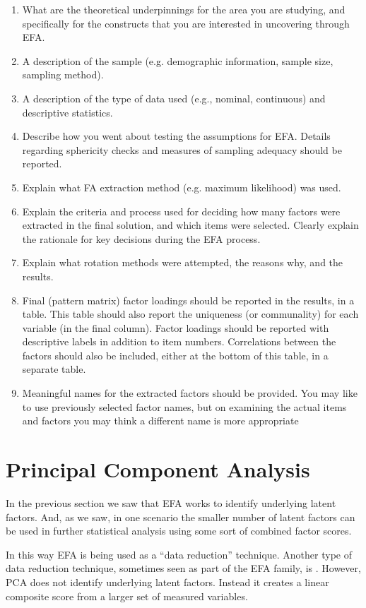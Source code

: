 \begin{enumerate} \itemsep -2pt
\item What are the theoretical underpinnings for the area you are studying, and specifically for the constructs that you are interested in uncovering through EFA. 
\item A description of the sample (e.g. demographic information, sample size, sampling method).
\item A description of the type of data used (e.g., nominal, continuous) and descriptive statistics.
\item Describe how you went about testing the assumptions for EFA. Details regarding sphericity checks and measures of sampling adequacy should be reported. 
\item Explain what FA extraction method (e.g. maximum likelihood) was used. 
\item Explain the criteria and process used for deciding how many factors were extracted in the final solution, and which items were selected. Clearly explain the rationale for key decisions during the EFA process.
\item Explain what rotation methods were attempted, the reasons why, and the results. 
\item Final (pattern matrix) factor loadings should be reported in the results, in a table. This table should also report the uniqueness (or communality) for each variable (in the final column). Factor loadings should be reported with descriptive labels in addition to item numbers. Correlations between the factors should also be included, either at the bottom of this table, in a separate table.
\item Meaningful names for the extracted factors should be provided. You may like to use previously selected factor names, but on examining the actual items and factors you may think a different name is more appropriate
\end{enumerate}


\section{Principal Component Analysis~\label{sec:PCA}}

In the previous section we saw that EFA works to identify underlying latent factors. And, as we saw, in one scenario the smaller number of latent factors can be used in further statistical analysis using some sort of combined factor scores.

In this way EFA is being used as a “data reduction” technique. Another type of data reduction technique, sometimes seen as part of the EFA family, is . However, PCA does not identify underlying latent factors. Instead it creates a linear composite score from a larger set of measured variables. 

